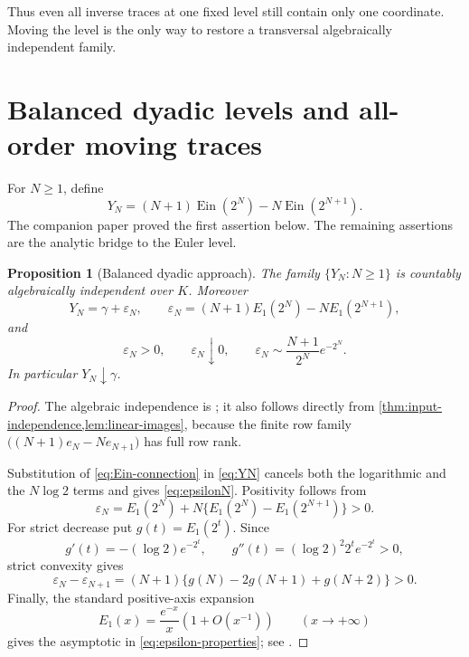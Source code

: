 \documentclass[11pt]{article}
\newtheorem{proposition}[theorem]{Proposition}
\theoremstyle{definition}
\theoremstyle{remark}
\newcommand{\Ein}{\operatorname{Ein}}
\begin{document}
Thus even all inverse traces at one fixed level still contain only one
coordinate.  Moving the level is the only way to restore a transversal
algebraically independent family.

\section{Balanced dyadic levels and all-order moving traces}
\label{sec:dyadic}

For \(N\ge1\), define
\begin{equation}\label{eq:YN}
 Y_N=(N+1)\Ein(2^N)-N\Ein(2^{N+1}).
\end{equation}
The companion paper proved the first assertion below.  The remaining
assertions are the analytic bridge to the Euler level.

\begin{proposition}[Balanced dyadic approach]
\label{prop:dyadic-approach}
The family \(\{Y_N:N\ge1\}\) is countably algebraically independent over
\(K\).  Moreover
\begin{equation}\label{eq:epsilonN}
 Y_N=\gamma+\varepsilon_N,
 \qquad
 \varepsilon_N=(N+1)E_1(2^N)-NE_1(2^{N+1}),
\end{equation}
and
\begin{equation}\label{eq:epsilon-properties}
 \varepsilon_N>0,\qquad
 \varepsilon_N\downarrow0,\qquad
 \varepsilon_N\sim\frac{N+1}{2^N}e^{-2^N}.
\end{equation}
In particular \(Y_N\downarrow\gamma\).
\end{proposition}

\begin{proof}
The algebraic independence is \cite[Lem.~11.2]{KEIO2026I}; it also follows directly from
\cref{thm:input-independence,lem:linear-images}, because the finite row family
\(\bigl((N+1)e_N-Ne_{N+1}\bigr)\) has full row rank.

Substitution of \eqref{eq:Ein-connection} in \eqref{eq:YN} cancels both the
logarithmic and the \(N\log2\) terms and gives \eqref{eq:epsilonN}.  Positivity
follows from
\[
 \varepsilon_N
 =E_1(2^N)+N\{E_1(2^N)-E_1(2^{N+1})\}>0.
\]
For strict decrease put \(g(t)=E_1(2^t)\).  Since
\[
 g'(t)=-(\log2)e^{-2^t},\qquad
 g''(t)=(\log2)^2 2^t e^{-2^t}>0,
\]
strict convexity gives
\[
 \varepsilon_N-\varepsilon_{N+1}
 =(N+1)\{g(N)-2g(N+1)+g(N+2)\}>0.
\]
Finally, the standard positive-axis expansion
\begin{equation}\label{eq:E1-asymptotic}
 E_1(x)=\frac{e^{-x}}x\left(1+O(x^{-1})\right)
 \qquad(x\to+\infty)
\end{equation}
gives the asymptotic in \eqref{eq:epsilon-properties}; see
\cite[\S6.12\(i\)]{DLMF}.
\end{proof}
\end{document}
